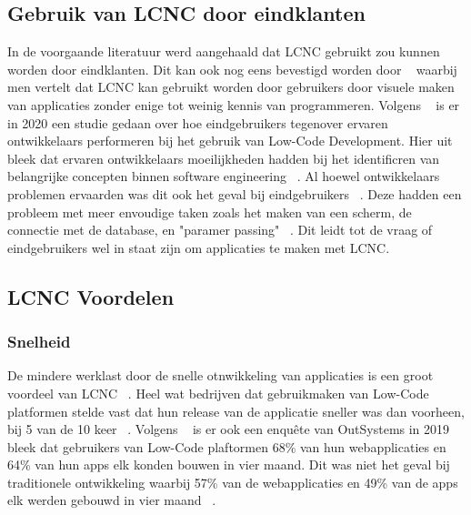 \subsection*{Gebruik van LCNC door eindklanten}
\label{sub:gebruik-van-lcnc-door-eindklanten}
In de voorgaande literatuur werd aangehaald dat LCNC gebruikt zou kunnen worden door eindklanten. Dit kan ook nog eens bevestigd
worden door ~\textcite{Yan2021} waarbij men vertelt dat LCNC kan gebruikt worden door gebruikers door visuele maken van applicaties zonder enige tot weinig kennis van programmeren. 
Volgens ~\textcite{Hintsch2021} is er in 2020 een studie gedaan over hoe eindgebruikers tegenover ervaren ontwikkelaars performeren bij het gebruik van Low-Code Development.
Hier uit bleek dat ervaren ontwikkelaars moeilijkheden hadden bij het identificren van belangrijke concepten binnen software engineering ~\autocite{Hintsch2021}. Al 
hoewel ontwikkelaars problemen ervaarden was dit ook het geval bij eindgebruikers ~\autocite{Hintsch2021}. Deze hadden een probleem met meer envoudige taken zoals het maken van een scherm,
de connectie met de database, en "paramer passing" ~\autocite{Hintsch2021}. Dit leidt tot de vraag of eindgebruikers wel in staat zijn om applicaties te maken met LCNC.
\subsection*{LCNC Voordelen}
\label{sub:lcnc-voordelen}
\subsubsection*{Snelheid}
\label{sub:snelheid}
De mindere werklast door de snelle otnwikkeling van applicaties is een groot voordeel van LCNC ~\autocite{Adrian_2020}.
Heel wat bedrijven dat gebruikmaken van Low-Code platformen stelde vast dat hun release van de applicatie sneller was dan voorheen, bij 5 van de 10 keer ~\autocite{Yan2021}.
Volgens ~\textcite{Yan2021} is er ook een enquête van OutSystems in 2019 bleek dat gebruikers van Low-Code plaftormen 68\% van hun webapplicaties en 64\% van hun apps elk konden bouwen in vier maand.
Dit was niet het geval bij traditionele ontwikkeling waarbij 57\% van de webapplicaties en 49\% van de apps elk werden gebouwd in vier maand ~\autocite{Yan2021}.

